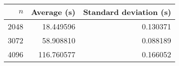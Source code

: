 \begin{tabular}{rrr}
$n$ & Average (s) & Standard deviation (s)\\\hline
2048 & 18.449596 & 0.130371\\
3072 & 58.908810 & 0.088189\\
4096 & 116.760577 & 0.166052\\
\end{tabular}
